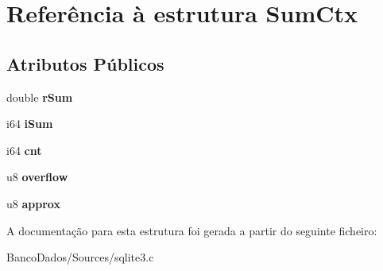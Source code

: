 \hypertarget{struct_sum_ctx}{\section{Referência à estrutura Sum\-Ctx}
\label{struct_sum_ctx}
}
\subsection*{Atributos Públicos}
\begin{DoxyCompactItemize}
\item 
\hypertarget{struct_sum_ctx_a1774080b9bcada2f4e867eaf40763f41}{double {\bfseries r\-Sum}}\label{struct_sum_ctx_a1774080b9bcada2f4e867eaf40763f41}

\item 
\hypertarget{struct_sum_ctx_ace6196fb30ebc0687997a723d55683db}{i64 {\bfseries i\-Sum}}\label{struct_sum_ctx_ace6196fb30ebc0687997a723d55683db}

\item 
\hypertarget{struct_sum_ctx_ada00261fe604a7cc6719fdcd8bb5914c}{i64 {\bfseries cnt}}\label{struct_sum_ctx_ada00261fe604a7cc6719fdcd8bb5914c}

\item 
\hypertarget{struct_sum_ctx_a3b14a5da00584aff08314d5e9ddbe9ea}{u8 {\bfseries overflow}}\label{struct_sum_ctx_a3b14a5da00584aff08314d5e9ddbe9ea}

\item 
\hypertarget{struct_sum_ctx_a035a2a22271fee066d9a92d12fe3b9a5}{u8 {\bfseries approx}}\label{struct_sum_ctx_a035a2a22271fee066d9a92d12fe3b9a5}

\end{DoxyCompactItemize}


A documentação para esta estrutura foi gerada a partir do seguinte ficheiro\-:\begin{DoxyCompactItemize}
\item 
Banco\-Dados/\-Sources/sqlite3.\-c\end{DoxyCompactItemize}
